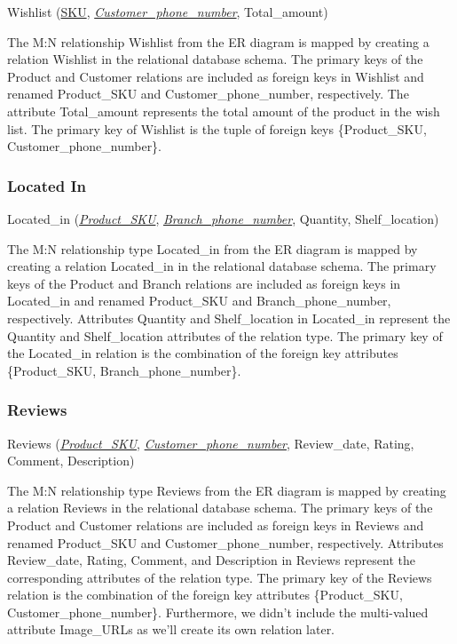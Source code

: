 Wishlist (\underline{SKU}, \underline{\textit{Customer\_phone\_number}}, Total\_amount)

The M:N relationship Wishlist from the ER diagram is mapped by creating a relation Wishlist in the relational database schema. The primary keys of the Product and Customer relations are included as foreign keys in Wishlist and renamed Product\_SKU and Customer\_phone\_number, respectively. The attribute Total\_amount represents the total amount of the product in the wish list. The primary key of Wishlist is the tuple of foreign keys \{Product\_SKU, Customer\_phone\_number\}.

\subsubsection{Located In}

Located\_in (\underline{\textit{Product\_SKU}}, \underline{\textit{Branch\_phone\_number}}, Quantity, Shelf\_location)

The M:N relationship type Located\_in from the ER diagram is mapped by creating a relation Located\_in in the relational database schema. The primary keys of the Product and Branch relations are included as foreign keys in Located\_in and renamed Product\_SKU and Branch\_phone\_number, respectively. Attributes Quantity and Shelf\_location in Located\_in represent the Quantity and Shelf\_location attributes of the relation type. The primary key of the Located\_in relation is the combination of the foreign key attributes \{Product\_SKU, Branch\_phone\_number\}.

\subsubsection{Reviews}

Reviews (\underline{\textit{Product\_SKU}}, \underline{\textit{Customer\_phone\_number}}, Review\_date, Rating, Comment, Description)

The M:N relationship type Reviews from the ER diagram is mapped by creating a relation Reviews in the relational database schema. The primary keys of the Product and Customer relations are included as foreign keys in Reviews and renamed Product\_SKU and Customer\_phone\_number, respectively. Attributes Review\_date, Rating, Comment, and Description in Reviews represent the corresponding attributes of the relation type. The primary key of the Reviews relation is the combination of the foreign key attributes \{Product\_SKU, Customer\_phone\_number\}. Furthermore, we didn't include the multi-valued attribute Image\_URLs as we'll create its own relation later.

